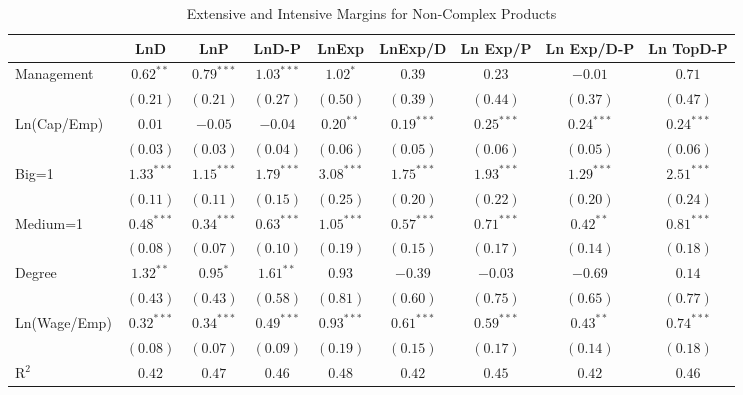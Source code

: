 \documentclass{article}
\begin{document}
\begin{table}
\caption{Extensive and Intensive Margins for Non-Complex Products}
\begin{center}
\begin{normalsize}
\begin{tabular}{l c c c c c c c c}
\hline
 & LnD & LnP & LnD-P & LnExp & LnExp/D & Ln Exp/P & Ln Exp/D-P & Ln TopD-P \\
\hline
Management   & $0.62^{**}$  & $0.79^{***}$ & $1.03^{***}$ & $1.02^{*}$   & $0.39$       & $0.23$       & $-0.01$      & $0.71$       \\
             & $(0.21)$     & $(0.21)$     & $(0.27)$     & $(0.50)$     & $(0.39)$     & $(0.44)$     & $(0.37)$     & $(0.47)$     \\
Ln(Cap/Emp)  & $0.01$       & $-0.05$      & $-0.04$      & $0.20^{**}$  & $0.19^{***}$ & $0.25^{***}$ & $0.24^{***}$ & $0.24^{***}$ \\
             & $(0.03)$     & $(0.03)$     & $(0.04)$     & $(0.06)$     & $(0.05)$     & $(0.06)$     & $(0.05)$     & $(0.06)$     \\
Big=1        & $1.33^{***}$ & $1.15^{***}$ & $1.79^{***}$ & $3.08^{***}$ & $1.75^{***}$ & $1.93^{***}$ & $1.29^{***}$ & $2.51^{***}$ \\
             & $(0.11)$     & $(0.11)$     & $(0.15)$     & $(0.25)$     & $(0.20)$     & $(0.22)$     & $(0.20)$     & $(0.24)$     \\
Medium=1     & $0.48^{***}$ & $0.34^{***}$ & $0.63^{***}$ & $1.05^{***}$ & $0.57^{***}$ & $0.71^{***}$ & $0.42^{**}$  & $0.81^{***}$ \\
             & $(0.08)$     & $(0.07)$     & $(0.10)$     & $(0.19)$     & $(0.15)$     & $(0.17)$     & $(0.14)$     & $(0.18)$     \\
Degree       & $1.32^{**}$  & $0.95^{*}$   & $1.61^{**}$  & $0.93$       & $-0.39$      & $-0.03$      & $-0.69$      & $0.14$       \\
             & $(0.43)$     & $(0.43)$     & $(0.58)$     & $(0.81)$     & $(0.60)$     & $(0.75)$     & $(0.65)$     & $(0.77)$     \\
Ln(Wage/Emp) & $0.32^{***}$ & $0.34^{***}$ & $0.49^{***}$ & $0.93^{***}$ & $0.61^{***}$ & $0.59^{***}$ & $0.43^{**}$  & $0.74^{***}$ \\
             & $(0.08)$     & $(0.07)$     & $(0.09)$     & $(0.19)$     & $(0.15)$     & $(0.17)$     & $(0.14)$     & $(0.18)$     \\
\hline
R$^2$        & $0.42$       & $0.47$       & $0.46$       & $0.48$       & $0.42$       & $0.45$       & $0.42$       & $0.46$       \\

\end{tabular}
\end{normalsize}
\end{center}
\end{table}
\end{document}
